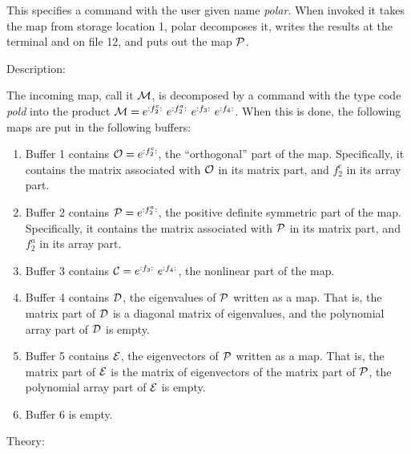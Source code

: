This specifies a command with the user given name {\em polar}.  When invoked it takes the map from storage location 1, polar decomposes it, writes the results at the terminal and on file 12, and puts out the map ${\cal P}$.

\vspace{5mm}
     Description:
\vspace{2mm}

     The incoming map, call it ${\cal M}$, is decomposed by a command with the
type code {\em pold } into the product ${\cal M} = e^{:f_2^c:} \ e^{:f_2^a:}
\ e^{:f_3:} \ e^{:f_4:} $.  When this is done,
the following maps are put in the following buffers:
\begin{enumerate}
          \item  Buffer 1 contains ${\cal O} = e^{:f_2^c:}$, the ``orthogonal''
                 part of the map.  Specifically, it contains the matrix
associated with ${\cal O}$ in its matrix part, and $f_2^c$ in its array part.

          \item  Buffer 2 contains ${\cal P} = e^{:f_2^a:}$, the positive definite
symmetric part of the map.  Specifically, it contains the matrix
associated with ${\cal P}$ in its matrix part, and $f_2^a$ in its array part.

          \item  Buffer 3 contains ${\cal C} = e^{:f_3:} \ e^{:f_4:}$, the nonlinear part of the map.

          \item  Buffer 4 contains ${\cal D}$, the eigenvalues of ${\cal P}$ written as a
                 map.  That is, the matrix part of ${\cal D}$ is a diagonal matrix
                 of eigenvalues, and the polynomial array part of ${\cal D}$ is
                 empty.

          \item  Buffer 5 contains ${\cal E}$, the eigenvectors of ${\cal P}$ written as a
                 map.  That is, the matrix part of ${\cal E}$ is the matrix of
                 eigenvectors of the matrix part of ${\cal P}$, the polynomial array
                 part of ${\cal E}$ is empty.

		  \item  Buffer 6 is empty.
\end{enumerate}

Theory: \\

